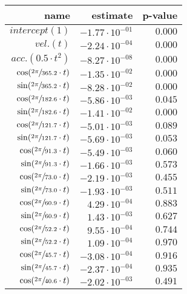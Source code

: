 \begin{tabular}{r|rr}
\hline
 name                                & estimate               & p-value   \\
\hline
 $intercept (1)$                     & $-1.77 \cdot 10^{-01}$ & $0.000$   \\
 $vel. (t)$                          & $-2.24 \cdot 10^{-04}$ & $0.000$   \\
 $acc. (0.5 \cdot t^2)$              & $-8.27 \cdot 10^{-08}$ & $0.000$   \\
 $\cos(\sfrac{2\pi}{365.2} \cdot t)$ & $-1.35 \cdot 10^{-02}$ & $0.000$   \\
 $\sin(\sfrac{2\pi}{365.2} \cdot t)$ & $-8.28 \cdot 10^{-02}$ & $0.000$   \\
 $\cos(\sfrac{2\pi}{182.6} \cdot t)$ & $-5.86 \cdot 10^{-03}$ & $0.045$   \\
 $\sin(\sfrac{2\pi}{182.6} \cdot t)$ & $-1.41 \cdot 10^{-02}$ & $0.000$   \\
 $\cos(\sfrac{2\pi}{121.7} \cdot t)$ & $-5.01 \cdot 10^{-03}$ & $0.089$   \\
 $\sin(\sfrac{2\pi}{121.7} \cdot t)$ & $-5.69 \cdot 10^{-03}$ & $0.053$   \\
 $\cos(\sfrac{2\pi}{91.3} \cdot t)$  & $-5.49 \cdot 10^{-03}$ & $0.060$   \\
 $\sin(\sfrac{2\pi}{91.3} \cdot t)$  & $-1.66 \cdot 10^{-03}$ & $0.573$   \\
 $\cos(\sfrac{2\pi}{73.0} \cdot t)$  & $-2.19 \cdot 10^{-03}$ & $0.455$   \\
 $\sin(\sfrac{2\pi}{73.0} \cdot t)$  & $-1.93 \cdot 10^{-03}$ & $0.511$   \\
 $\cos(\sfrac{2\pi}{60.9} \cdot t)$  & $4.29 \cdot 10^{-04}$  & $0.883$   \\
 $\sin(\sfrac{2\pi}{60.9} \cdot t)$  & $1.43 \cdot 10^{-03}$  & $0.627$   \\
 $\cos(\sfrac{2\pi}{52.2} \cdot t)$  & $9.55 \cdot 10^{-04}$  & $0.744$   \\
 $\sin(\sfrac{2\pi}{52.2} \cdot t)$  & $1.09 \cdot 10^{-04}$  & $0.970$   \\
 $\cos(\sfrac{2\pi}{45.7} \cdot t)$  & $-3.08 \cdot 10^{-04}$ & $0.916$   \\
 $\sin(\sfrac{2\pi}{45.7} \cdot t)$  & $-2.37 \cdot 10^{-04}$ & $0.935$   \\
 $\cos(\sfrac{2\pi}{40.6} \cdot t)$  & $-2.02 \cdot 10^{-03}$ & $0.491$   \\
\hline
\end{tabular}\hspace{1cm}\begin{tabular}{r|rr}

\end{tabular}
